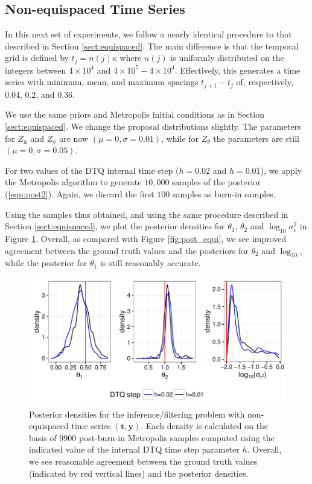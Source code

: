 \documentclass[wcp]{jmlr}
\begin{document}
\subsection{Non-equispaced Time Series}
\label{sect:nonequispaced}
In this next set of experiments, we follow a nearly identical
procedure to that described in Section \ref{sect:equispaced}.  The
main difference is that the temporal grid is defined by $t_j = n(j)
\kappa$ where $n(j)$ is uniformly distributed on the integers between
$4 \times 10^{4}$ and $4 \times 10^5 - 4 \times 10^4$.  Effectively,
this generates a time series with minimum, mean, and maximum spacings
$t_{j+1} - t_j$ of, respectively, $0.04$, $0.2$, and $0.36$.

We use the same priors and Metropolis initial conditions as in Section \ref{sect:equispaced}.  We change
the proposal distributions slightly.  The parameters for
$Z_{\mathbf{x}}$ and $Z_\sigma$ are now $(\mu=0,\sigma=0.01)$, while
for $Z_\theta$ the parameters are still $(\mu=0,\sigma=0.05)$.

For two values of the DTQ internal time step ($h = 0.02$ and
$h=0.01$), we apply the Metropolis algorithm to generate $10,000$
samples of the posterior (\ref{eqn:post2}).  Again, we discard the
first $100$ samples as burn-in samples.

Using the samples thus obtained, and using the same procedure
described in Section \ref{sect:equispaced}, we plot the posterior densities for
$\theta_1$, $\theta_2$ and $\log_{10} \sigma_\epsilon^2$ in Figure
\ref{fig:post_nonequi}.  Overall, as compared with Figure
\ref{fig:post_equi}, we see improved agreement between the ground
truth values and the posteriors for $\theta_2$ and
$\log_{10}$, while the posterior for $\theta_1$ is still reasonably
accurate.


\begin{figure}[th]
\begin{center}
\includegraphics[width=6in]{post_nonequi}
\end{center}
\caption{Posterior densities for the inference/filtering problem with
  non-equispaced time series $(\mathbf{t},\mathbf{y})$.  Each density is
  calculated on the basis of $9900$ post-burn-in Metropolis samples
  computed  using the indicated value of the internal DTQ time step
  parameter $h$.  Overall, we see reasonable agreement between the
  ground truth values (indicated by red vertical lines) and the
  posterior densities.}
\label{fig:post_nonequi}
\end{figure}
\end{document}
